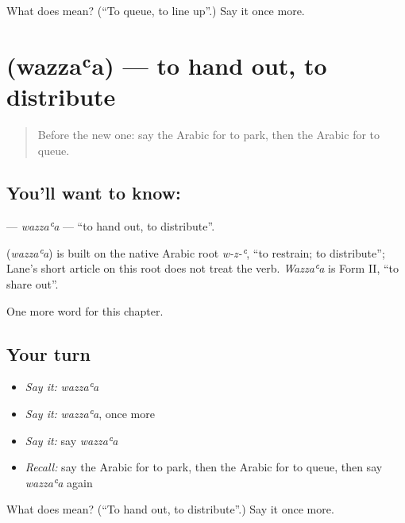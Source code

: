 \begin{tcolorbox}[breakable,colback=teal!4,colframe=teal!35!black,title={Before you move on}]
What does  mean? (\textquotedblleft{}To queue, to line up\textquotedblright{}.) Say it once more.
\end{tcolorbox}
\section[\texorpdfstring{\ar{وزع} (wazzaʿa)}{وزع (wazzaʿa)}]{ (wazzaʿa) — to hand out, to distribute}

\label{lesson:AR-C261-wazzaa}



\begin{quote}
Before the new one: say the Arabic for to park, then the Arabic for to queue.
\end{quote}

\subsection*{You'll want to know: }
\textbf{} — \emph{wazzaʿa} — \textquotedblleft{}to hand out, to distribute\textquotedblright{}.

\begin{cousinweb}
\textbf{} (\emph{wazzaʿa}) is built on the native Arabic root \emph{w-z-ʿ}, \textquotedblleft{}to restrain; to distribute\textquotedblright{}; Lane's short article on this root does not treat the verb. \emph{Wazzaʿa} is Form II, \textquotedblleft{}to share out\textquotedblright{}.
\end{cousinweb}

\begin{grammarlens}[title={What you've built}]
One more word for this chapter.
\end{grammarlens}

\subsection*{Your turn}
\begin{itemize}
\raggedright
  \item \emph{Say it:} \emph{wazzaʿa}
  \item \emph{Say it:} \emph{wazzaʿa}, once more
  \item \emph{Say it:} say \emph{wazzaʿa}
  \item \emph{Recall:} say the Arabic for to park, then the Arabic for to queue, then say \emph{wazzaʿa} again
\end{itemize}

\begin{tcolorbox}[breakable,colback=teal!4,colframe=teal!35!black,title={Before you move on}]
What does  mean? (\textquotedblleft{}To hand out, to distribute\textquotedblright{}.) Say it once more.
\end{tcolorbox}
